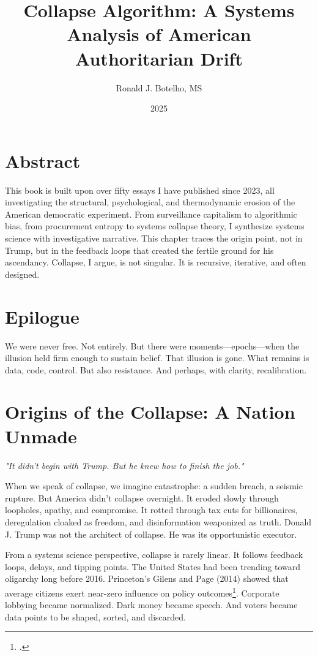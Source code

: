 \documentclass[12pt]{book}
\title{Collapse Algorithm: A Systems Analysis of American Authoritarian Drift}
\author{Ronald J. Botelho, MS}
\date{2025}
\begin{document}
\maketitle

\chapter*{Abstract}
This book is built upon over fifty essays I have published since 2023, all investigating the structural, psychological, and thermodynamic erosion of the American democratic experiment. From surveillance capitalism to algorithmic bias, from procurement entropy to systems collapse theory, I synthesize systems science with investigative narrative. This chapter traces the origin point, not in Trump, but in the feedback loops that created the fertile ground for his ascendancy. Collapse, I argue, is not singular. It is recursive, iterative, and often designed.

\chapter*{Epilogue}
We were never free. Not entirely. But there were moments—epochs—when the illusion held firm enough to sustain belief. That illusion is gone. What remains is data, code, control. But also resistance. And perhaps, with clarity, recalibration.

\chapter{Origins of the Collapse: A Nation Unmade}

\textit{"It didn't begin with Trump. But he knew how to finish the job."}

When we speak of collapse, we imagine catastrophe: a sudden breach, a seismic rupture. But America didn't collapse overnight. It eroded slowly through loopholes, apathy, and compromise. It rotted through tax cuts for billionaires, deregulation cloaked as freedom, and disinformation weaponized as truth. Donald J. Trump was not the architect of collapse. He was its opportunistic executor.

From a systems science perspective, collapse is rarely linear. It follows feedback loops, delays, and tipping points. The United States had been trending toward oligarchy long before 2016. Princeton's Gilens and Page (2014) showed that average citizens exert near-zero influence on policy outcomes\footcite{gilens2014testing}. Corporate lobbying became normalized. Dark money became speech. And voters became data points to be shaped, sorted, and discarded.
\end{document}
